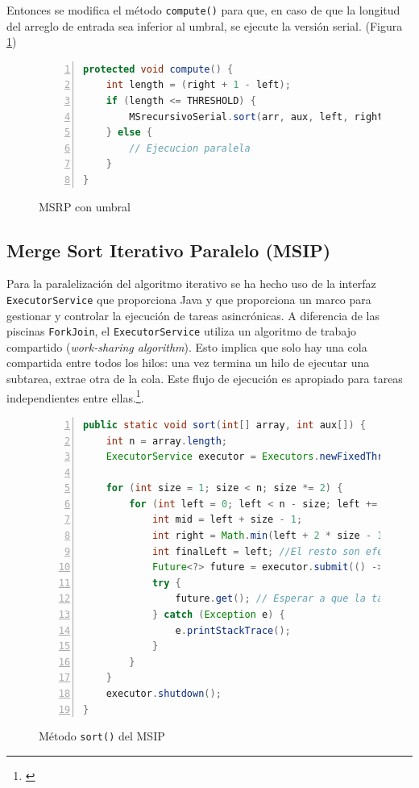 \documentclass[titlepage]{article}
\begin{document}
Entonces se modifica el método \lstinline{compute()} para que, en caso de que la longitud del arreglo de entrada sea inferior al umbral, se ejecute la versión serial. (Figura \ref{fig:computeModificado})

\begin{figure}[h]
	\begin{lstlisting}[language=java, frame=single, numbers=left]
protected void compute() {
	int length = (right + 1 - left);
	if (length <= THRESHOLD) {
		MSrecursivoSerial.sort(arr, aux, left, right);
	} else {
		// Ejecucion paralela
	}
}
	\end{lstlisting}
	\caption{MSRP con umbral}
	\label{fig:computeModificado}
\end{figure}

\subsection{Merge Sort Iterativo Paralelo (MSIP)}
Para la paralelización del algoritmo iterativo se ha hecho uso de la interfaz \lstinline{ExecutorService} que proporciona Java y que proporciona un marco para gestionar y controlar la ejecución de tareas asincrónicas. A diferencia de las piscinas \lstinline{ForkJoin}, el \lstinline{ExecutorService} utiliza un algoritmo de trabajo compartido (\textit{work-sharing algorithm}). Esto implica que solo hay una cola compartida entre todos los hilos: una vez termina un hilo de ejecutar una subtarea, extrae otra de la cola. Este flujo de ejecución es apropiado para tareas independientes entre ellas.\footnote{\cite{OracleExecutorService}}.

\begin{figure}[h]
	\centering
	\begin{lstlisting}[language=java, frame=single, numbers=left]
public static void sort(int[] array, int aux[]) {
	int n = array.length;
	ExecutorService executor = Executors.newFixedThreadPool(parallelismLevel);
	
	for (int size = 1; size < n; size *= 2) {
		for (int left = 0; left < n - size; left += 2 * size) {
			int mid = left + size - 1;
			int right = Math.min(left + 2 * size - 1, n - 1);
			int finalLeft = left; //El resto son efectivamente finales
			Future<?> future = executor.submit(() -> merge(array, aux, finalLeft, mid, right));
			try {
				future.get(); // Esperar a que la tarea termine
			} catch (Exception e) {
				e.printStackTrace();
			}
		}
	}
	executor.shutdown();
}
	\end{lstlisting}
	
	\caption{Método \lstinline{sort()} del MSIP}
	\label{fig:MSIP_sort()}
\end{figure}
\end{document}
